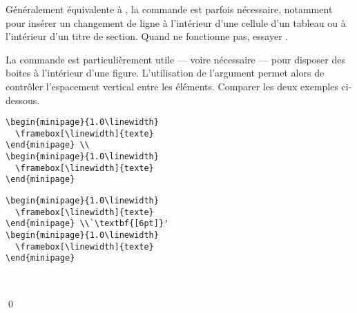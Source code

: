 Généralement équivalente à {\bs\bs}, la commande \cmd{\newline} est
parfois nécessaire, notamment pour insérer un changement de ligne à
l'intérieur d'une cellule d'un tableau ou à l'intérieur d'un titre de
section. Quand {\bs\bs} ne fonctionne pas, essayer
\cmdprint{\newline}.

\begin{exemple}
  La commande {\bs\bs} est particulièrement utile --- voire nécessaire
  --- pour disposer des boites à l'intérieur d'une figure.
  L'utilisation de l'argument  permet alors de
  contrôler l'espacement vertical entre les éléments. Comparer les
  deux exemples ci-dessous.
  \begin{demo}
    \begin{texample}[0.55\linewidth]
\begin{lstlisting}
\begin{minipage}{1.0\linewidth}
  \framebox[\linewidth]{texte}
\end{minipage} \\
\begin{minipage}{1.0\linewidth}
  \framebox[\linewidth]{texte}
\end{minipage}
\end{lstlisting}
      \producing
      \begin{minipage}{1.0\linewidth}
      \end{minipage}
      \begin{minipage}{1.0\linewidth}
      \end{minipage}
    \end{texample}

    \begin{texample}[0.55\linewidth]
\begin{lstlisting}
\begin{minipage}{1.0\linewidth}
  \framebox[\linewidth]{texte}
\end{minipage} \\`\textbf{[6pt]}'
\begin{minipage}{1.0\linewidth}
  \framebox[\linewidth]{texte}
\end{minipage}
\end{lstlisting}
      \producing
      \begin{minipage}{1.0\linewidth}
      \end{minipage} \\[6pt]
      \begin{minipage}{1.0\linewidth}
      \end{minipage}
    \end{texample}
  \end{demo}
  \qed
\end{exemple}

